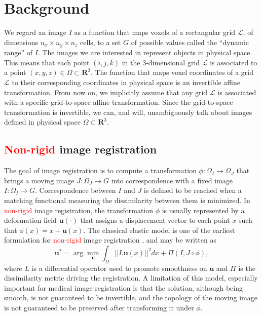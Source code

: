 \section{Background}
We regard an image $I$ as a function that maps voxels of a rectangular grid \hbox{$\mathcal{L}$}, of dimensions $n_{x} \times n_{y} \times n_{z}$ cells, to a set $G$ of
possible values called the ``dynamic range'' of $I$. The images we are interested in represent objects in physical space. This means that each point $(i,j,k)$ in the
3-dimensional grid $\mathcal{L}$ is associated to a point $(x,y,z) \in \Omega \subset \mathbf{R}^{3}$. The function that maps voxel coordinates of a grid $\mathcal{L}$ to their corresponding coordinates in physical space is an invertible affine transformation. From now on, we implicitly assume that any grid $\mathcal{L}$ is associated with a specific grid-to-space affine transformation. Since the grid-to-space transformation is invertible, we can, and will, unambiguously talk about images defined in physical space $\Omega \subset \mathbf{R}^{3}$.\\

\vspace{-0.5cm}
\subsection{\textcolor{red}{Non-rigid} image registration}\label{sec:non_linear_image_registration}
The goal of image registration is to compute a transformation $\phi: \Omega_{I} \rightarrow \Omega_{J}$ that brings a moving image $J:\Omega_{J} \rightarrow G$ into correspondence
with a fixed image $I:\Omega_{I} \rightarrow G$. Correspondence between $I$ and $J$ is defined to be reached when a matching functional measuring the dissimilarity between them is minimized. In \textcolor{red}{non-rigid} image registration, the transformation $\phi$ is usually represented by a deformation field $\mathbf{u(\cdot)}$ that assigns a displacement vector
to each point $x$ such that $\phi(x) = x + \mathbf{u}(x)$. The classical elastic model is one of the earliest formulation for \textcolor{red}{non-rigid} image registration \cite{Bajcsy1982, Gee1999}, and may be written as
\begin{equation}\label{eq:elastic}
    \mathbf{u}^{*} = \arg \min_{\mathbf{u}} \int_{\Omega} ||L \mathbf{u}(x)||^{2}dx + \Pi(I, J \circ \phi),
\end{equation}
where $L$ is a differential operator used to promote smoothness on $\mathbf{u}$ and $\Pi$ is the dissimilarity metric driving the registration. A limitation of this model, especially important for medical image registration is that the solution, although being smooth, is not guaranteed to be invertible, and the topology of the moving image is not guaranteed to be preserved after transforming it under $\phi$.\\

